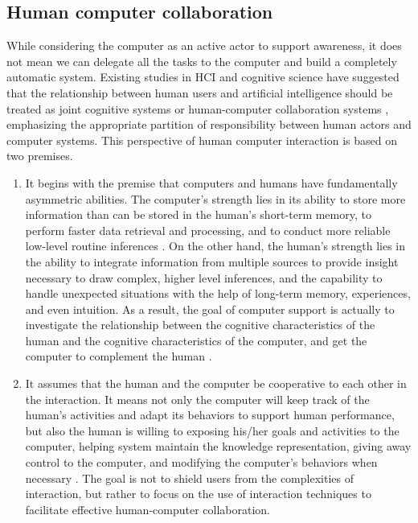 \subsection{Human computer collaboration} %
\label{sub:human_computer_collaboration}
While considering the computer as an active actor to support awareness, it does not mean we can delegate all the tasks to the computer and build a completely automatic system. Existing studies in HCI and cognitive science have suggested that the relationship between human users and artificial intelligence should be treated as joint cognitive systems \cite{Dalal1994} or human-computer collaboration systems \cite{Terveen1995}, emphasizing the appropriate partition of responsibility between human actors and computer systems. This perspective of human computer interaction is based on two premises.

\begin{enumerate}
   \item It begins with the premise that computers and humans have fundamentally asymmetric abilities. The computer's strength lies in its ability to store more information than can be stored in the human's short-term memory, to perform faster data retrieval and processing, and to conduct more reliable low-level routine inferences \cite{Brown99activeuser}. On the other hand, the human's strength lies in the ability to integrate information from multiple sources to provide insight necessary to draw complex, higher level inferences, and the capability to handle unexpected situations with the help of long-term memory, experiences, and even intuition. As a result, the goal of computer support is actually to investigate the relationship between the cognitive characteristics of the human and the cognitive characteristics of the computer, and get the computer to complement the human \cite{Dalal1994}.
   \item It assumes that the human and the computer be cooperative to each other in the interaction. It means not only the computer will keep track of the human's activities and adapt its behaviors to support human performance, but also the human is willing to exposing his/her goals and activities to the computer, helping system maintain the knowledge representation, giving away control to the computer, and modifying the computer's behaviors when necessary \cite{Terveen1995}. The goal is not to shield users from the complexities of interaction, but rather to focus on the use of interaction techniques to facilitate effective human-computer collaboration.
\end{enumerate}

